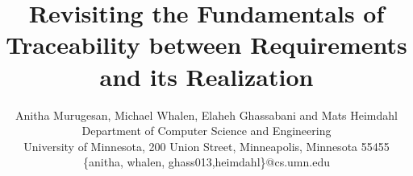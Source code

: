 \documentclass{IEEEtran}
\begin{document}
    \newcommand{\mike}[1]{\textcolor{green}{\emph {Mike: #1}}}
    \newcommand{\mats}[1]{\textcolor{blue}{\sc Mats: #1}}
    \newcommand{\sanjai}[1]{\textcolor{magenta}{\sc Sanjai: #1}}
    \newcommand{\anitha}[1]{\textcolor{red}{\emph {Anitha: #1}}}
    \newcommand{\req}[1]{\textcolor{blue}{\begin{quotation}\emph{#1}\end{quotation}}} %
    \newcommand{\eq}[1]{\textcolor{blue}{\begin{equation} #1\end{equation}}}
    \sloppypar


\title{Revisiting the Fundamentals of Traceability between Requirements and its Realization}

\author{Anitha Murugesan, Michael Whalen, Elaheh Ghassabani and Mats Heimdahl \\
      {Department of Computer Science and Engineering}\\
      {University of Minnesota, 200 Union Street, Minneapolis, Minnesota 55455}\\
      {\{anitha, whalen, ghass013,heimdahl\}@cs.umn.edu}
}

    \maketitle

    \begin{abstract}
    
    \end{abstract}

    
    
    
    
%    
%    
    

%    
%    

%



\end{document}
